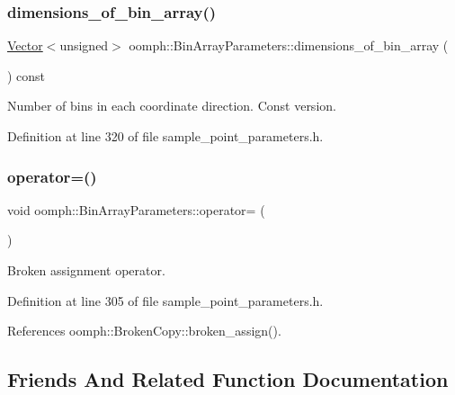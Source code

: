 \subsubsection{\texorpdfstring{dimensions\+\_\+of\+\_\+bin\+\_\+array()}{dimensions\_of\_bin\_array()}\hspace{0.1cm}{\footnotesize\ttfamily [2/2]}}
{\footnotesize\ttfamily \hyperlink{classoomph_1_1Vector}{Vector}$<$unsigned$>$ oomph\+::\+Bin\+Array\+Parameters\+::dimensions\+\_\+of\+\_\+bin\+\_\+array (\begin{DoxyParamCaption}{ }\end{DoxyParamCaption}) const\hspace{0.3cm}{\ttfamily [inline]}}



Number of bins in each coordinate direction. Const version. 



Definition at line 320 of file sample\+\_\+point\+\_\+parameters.\+h.

\mbox{\label{classoomph_1_1BinArrayParameters_a75c95b9419516e5ca6328a9f03432467}} 
\subsubsection{\texorpdfstring{operator=()}{operator=()}}
{\footnotesize\ttfamily void oomph\+::\+Bin\+Array\+Parameters\+::operator= (\begin{DoxyParamCaption}\item[{const \hyperlink{classoomph_1_1BinArrayParameters}{Bin\+Array\+Parameters} \&}]{ }\end{DoxyParamCaption})\hspace{0.3cm}{\ttfamily [inline]}}



Broken assignment operator. 



Definition at line 305 of file sample\+\_\+point\+\_\+parameters.\+h.



References oomph\+::\+Broken\+Copy\+::broken\+\_\+assign().



\subsection{Friends And Related Function Documentation}
\mbox{\label{classoomph_1_1BinArrayParameters_a63762b7198d7c1a8df01b39c74ba2ad9}} 

